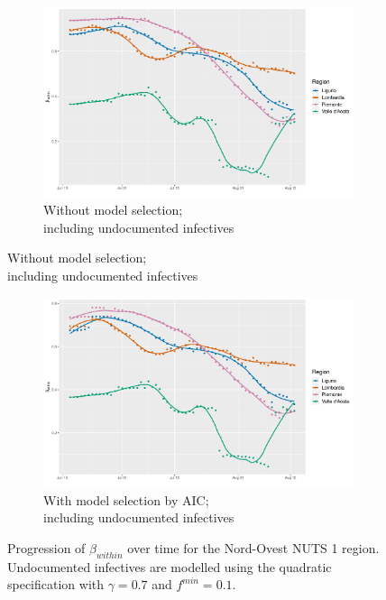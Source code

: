 \documentclass[12pt]{article}
\begin{document}
\begin{appendices}
\begin{figure}[H]
        \end{figure}
        \begin{figure}[H]\ContinuedFloat
    	    \begin{subfigure}{\textwidth}
    	      \centering
    	      \includegraphics[width=0.94\linewidth]{output/model_within_lag14_betawithin_Nord-Ovest_UndocQuadratic_rolling.pdf}
    	      \caption{Without model selection; \\ including undocumented infectives}
    	      \label{fig:beta_within_over_time_northwest_regular_undoc}
    	    \end{subfigure}\newline
        \end{figure}
        \begin{figure}[H]\ContinuedFloat
    	    \begin{subfigure}{\textwidth}
    	      \centering
    	      \includegraphics[width=0.94\linewidth]{output/model_within_lag14_betawithin_Nord-Ovest_aic_UndocQuadratic_rolling.pdf}
    	      \caption{With model selection by AIC; \\ including undocumented infectives}
    	      \label{fig:beta_within_over_time_northwest_aic_undoc}
    	    \end{subfigure}
    	    \caption{Progression of $\beta_{within}$ over time for the Nord-Ovest NUTS 1 region. Undocumented infectives are modelled using the quadratic specification with $\gamma = 0.7$ and $f^{min}=0.1$.}
    	    \label{fig:beta_within_over_time_northwest}
    	\end{figure}
		

\end{appendices}
\end{document}
